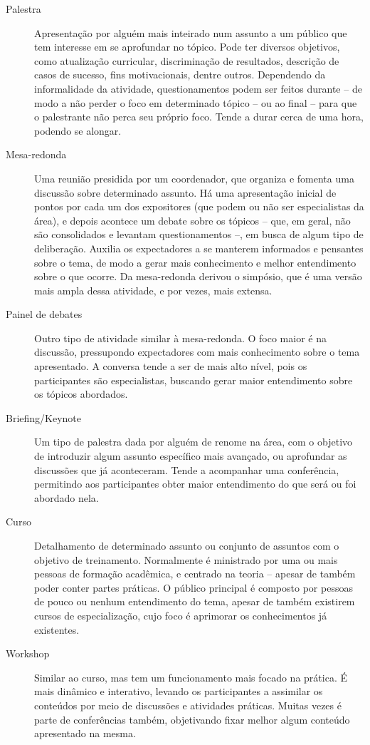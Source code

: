 \documentclass[12pt,a4paper,twoside,hyphens,english,brazil]{abntex2}
\begin{document}
\begin{description}
	\item[Palestra] Apresentação por alguém mais inteirado num assunto a um público que tem interesse em se aprofundar no tópico. Pode ter diversos objetivos, como atualização curricular, discriminação de resultados, descrição de casos de sucesso, fins motivacionais, dentre outros. Dependendo da informalidade da atividade, questionamentos podem ser feitos durante -- de modo a não perder o foco em determinado tópico -- ou ao final -- para que o palestrante não perca seu próprio foco. Tende a durar cerca de uma hora, podendo se alongar. 

	\item[Mesa-redonda] Uma reunião presidida por um coordenador, que organiza e fomenta uma discussão sobre determinado assunto. Há uma apresentação inicial de pontos por cada um dos expositores (que podem ou não ser especialistas da área), e depois acontece um debate sobre os tópicos -- que, em geral, não são consolidados e levantam questionamentos --, em busca de algum tipo de deliberação. Auxilia os expectadores a se manterem informados e pensantes sobre o tema, de modo a gerar mais conhecimento e melhor entendimento sobre o que ocorre. Da mesa-redonda derivou o simpósio, que é uma versão mais ampla dessa atividade, e por vezes, mais extensa.

	\item[Painel de debates] Outro tipo de atividade similar \`a mesa-redonda. O foco maior é na discussão, pressupondo expectadores com mais conhecimento sobre o tema apresentado. A conversa tende a ser de mais alto nível, pois os participantes são especialistas, buscando gerar maior entendimento sobre os tópicos abordados.

	\item[Briefing/Keynote] Um tipo de palestra dada por alguém de renome na área, com o objetivo de introduzir algum assunto específico mais avançado, ou aprofundar as discussões que já aconteceram. Tende a acompanhar uma conferência, permitindo aos participantes obter maior entendimento do que será ou foi abordado nela.

	\item[Curso] Detalhamento de determinado assunto ou conjunto de assuntos com o objetivo de treinamento. Normalmente é ministrado por uma ou mais pessoas de formação acadêmica, e centrado na teoria -- apesar de também poder conter partes práticas. O público principal é composto por pessoas de pouco ou nenhum entendimento do tema, apesar de também existirem cursos de especialização, cujo foco é aprimorar os conhecimentos já existentes.

	\item[Workshop] Similar ao curso, mas tem um funcionamento mais focado na prática. É mais dinâmico e interativo, levando os participantes a assimilar os conteúdos por meio de discussões e atividades práticas. Muitas vezes é parte de conferências também, objetivando fixar melhor algum conteúdo apresentado na mesma.
\end{description}
\end{document}
